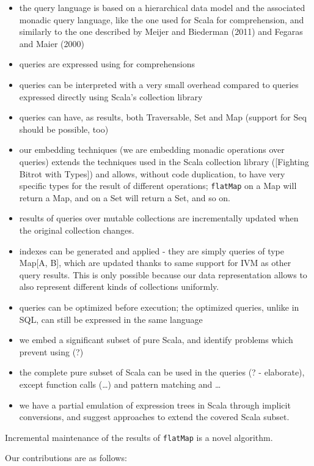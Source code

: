 \documentclass[preprint,authoryear,10pt]{sigplanconf}
\begin{document}
\begin{itemize}
\item
  the query language is based on a hierarchical data model and the
  associated monadic query language, like the one used for Scala for
  comprehension, and similarly to the one described by Meijer and
  Biederman (2011) and Fegaras and Maier (2000)
\item
  queries are expressed using for comprehensions
\item
  queries can be interpreted with a very small overhead compared to
  queries expressed directly using Scala's collection library
\item
  queries can have, as results, both Traversable, Set and Map (support
  for Seq should be possible, too)
\item
  our embedding techniques (we are embedding monadic operations over
  queries) extends the techniques used in the Scala collection library
  ({[}Fighting Bitrot with Types{]}) and allows, without code
  duplication, to have very specific types for the result of different
  operations; \texttt{flatMap} on a Map will return a Map, and on a Set
  will return a Set, and so on.
\item
  results of queries over mutable collections are incrementally updated
  when the original collection changes.
\item
  indexes can be generated and applied - they are simply queries of type
  Map{[}A, B{]}, which are updated thanks to same support for IVM as
  other query results. This is only possible because our data
  representation allows to also represent different kinds of collections
  uniformly.
\item
  queries can be optimized before execution; the optimized queries,
  unlike in SQL, can still be expressed in the same language
\item
  we embed a significant subset of pure Scala, and identify problems
  which prevent using (?)
\item
  the complete pure subset of Scala can be used in the queries (? -
  elaborate), except function calls (\ldots{}) and pattern matching and
  \ldots{}
\item
  we have a partial emulation of expression trees in Scala through
  implicit conversions, and suggest approaches to extend the covered
  Scala subset.
\end{itemize}
Incremental maintenance of the results of \texttt{flatMap} is a novel
algorithm.

Our contributions are as follows:
\end{document}
